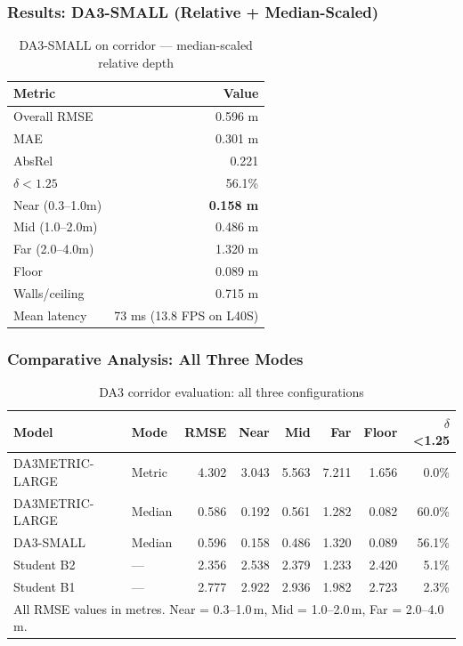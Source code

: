 \documentclass[11pt,a4paper]{article}
\begin{document}
\subsubsection{Results: DA3-SMALL (Relative + Median-Scaled)}

\begin{table}[h]
\centering
\caption{DA3-SMALL on corridor --- median-scaled relative depth}
\label{tab:iter9-da3-small}
\begin{tabular}{lr}
\toprule
\textbf{Metric} & \textbf{Value} \\
\midrule
Overall RMSE      & 0.596 m \\
MAE               & 0.301 m \\
AbsRel            & 0.221 \\
$\delta < 1.25$   & 56.1\% \\
\midrule
Near (0.3--1.0m)  & \textcolor{improved}{\textbf{0.158 m}} \\
Mid (1.0--2.0m)   & 0.486 m \\
Far (2.0--4.0m)   & 1.320 m \\
\midrule
Floor             & 0.089 m \\
Walls/ceiling     & 0.715 m \\
\midrule
Mean latency      & 73 ms (13.8 FPS on L40S) \\
\bottomrule
\end{tabular}
\end{table}

\subsubsection{Comparative Analysis: All Three Modes}

\begin{table}[h]
\centering
\caption{DA3 corridor evaluation: all three configurations}
\label{tab:iter9-all}
\begin{tabular}{llrrrrrr}
\toprule
\textbf{Model} & \textbf{Mode} & \textbf{RMSE} & \textbf{Near} & \textbf{Mid} & \textbf{Far} & \textbf{Floor} & \textbf{$\delta$\textless 1.25} \\
\midrule
DA3METRIC-LARGE & Metric    & \textcolor{regression}{4.302} & 3.043 & 5.563 & 7.211 & 1.656 & 0.0\% \\
DA3METRIC-LARGE & Median    & \textcolor{improved}{0.586}  & 0.192 & 0.561 & 1.282 & 0.082 & 60.0\% \\
DA3-SMALL       & Median    & 0.596 & \textcolor{improved}{0.158} & \textcolor{improved}{0.486} & 1.320 & 0.089 & 56.1\% \\
\midrule
Student B2      & ---       & 2.356 & 2.538 & 2.379 & 1.233 & 2.420 & 5.1\% \\
Student B1      & ---       & 2.777 & 2.922 & 2.936 & 1.982 & 2.723 & 2.3\% \\
\bottomrule
\multicolumn{8}{l}{\footnotesize All RMSE values in metres. Near = 0.3--1.0\,m, Mid = 1.0--2.0\,m, Far = 2.0--4.0\,m.}
\end{tabular}
\end{table}
\end{document}
